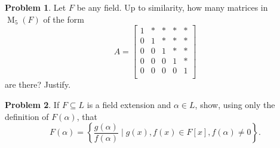 \documentclass[11pt]{article}
\DeclareMathOperator{\M}{M}
\theoremstyle{definition}
\newtheorem{problem}{Problem}
\begin{document}
\begin{problem}
Let $F$ be any field. Up to similarity, how many matrices in $\M_{5}(F)$ of the  form
$$A = \begin{bmatrix}
    1 & * & * & * & * \\
    0 & 1 & * & * & * \\
    0 & 0 & 1 & * & * \\
    0 & 0 & 0 & 1 & * \\
    0 & 0 & 0 & 0 & 1 \\
\end{bmatrix}$$
are there? Justify. 
\end{problem}



\begin{problem}
If $F \subseteq L$ is a field extension and $\alpha \in L$, show, using only the definition of $F(\alpha)$, that
$$F(\alpha) = \left\{ \frac{g(\alpha)}{f(\alpha)} \mid g(x), f(x) \in F[x], f(\alpha) \neq 0 \right\}.$$
\end{problem}
\end{document}
